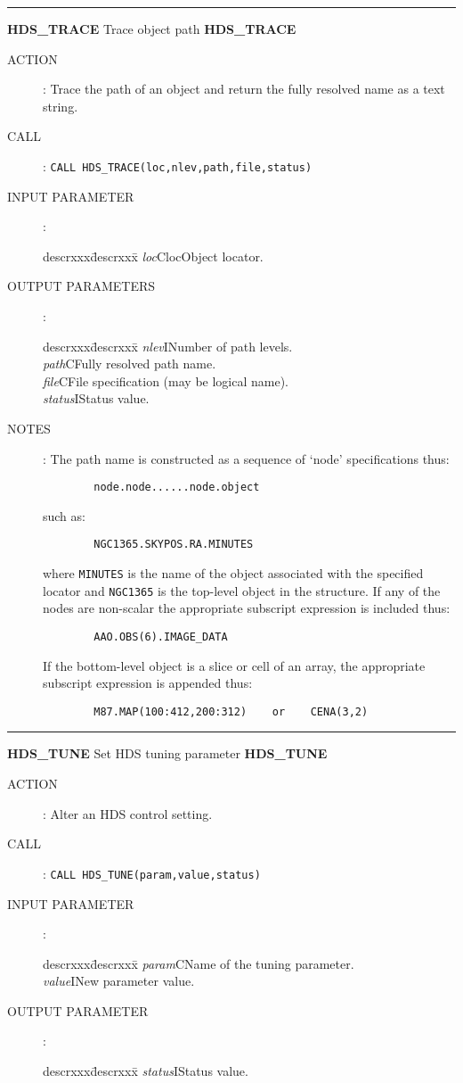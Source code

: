 \goodbreak
\rule{\textwidth}{0.3mm}
{\Large {\bf HDS\_TRACE} \hfill Trace object path \hfill {\bf HDS\_TRACE}}
\begin{description}
\item [ACTION]:
Trace the path of an object and return the fully resolved name as a text
string.
\item [CALL]:
{\tt CALL HDS\_TRACE(loc,nlev,path,file,status)}
\item [INPUT PARAMETER]:
\begin{tabbing}
descrxxx\=descrxxx\=\kill
{\em loc}\>Cloc\>Object locator.
\end{tabbing}
\item [OUTPUT PARAMETERS]:
\begin{tabbing}
descrxxx\=descrxxx\=\kill
{\em nlev}\>I\>Number of path levels.\\
{\em path}\>C\>Fully resolved path name.\\
{\em file}\>C\>File specification (may be logical name).\\
{\em status}\>I\>Status value.
\end{tabbing}
\item [NOTES]:
The path name is constructed as a sequence of `node' specifications thus:
\begin{verbatim}
        node.node......node.object
\end{verbatim}
such as:
\begin{verbatim}
        NGC1365.SKYPOS.RA.MINUTES
\end{verbatim}
where {\tt MINUTES} is the name of the object associated with the specified locator
and {\tt NGC1365} is the top-level object in the structure.
If any of the nodes are non-scalar the appropriate subscript expression is
included thus:
\begin{verbatim}
        AAO.OBS(6).IMAGE_DATA
\end{verbatim}
If the bottom-level object is a slice or cell of an array, the appropriate
subscript expression is appended thus:
\begin{verbatim}
        M87.MAP(100:412,200:312)    or    CENA(3,2)
\end{verbatim}
\end{description}
\goodbreak
\rule{\textwidth}{0.3mm}
{\Large {\bf HDS\_TUNE} \hfill Set HDS tuning parameter \hfill {\bf HDS\_TUNE}}
\begin{description}
\item [ACTION]:
Alter an HDS control setting.
\item [CALL]:
{\tt CALL HDS\_TUNE(param,value,status)}
\item [INPUT PARAMETER]:
\begin{tabbing}
descrxxx\=descrxxx\=\kill
{\em param}\>C\>Name of the tuning parameter.\\
{\em value}\>I\>New parameter value.
\end{tabbing}
\item [OUTPUT PARAMETER]:
\begin{tabbing}
descrxxx\=descrxxx\=\kill
{\em status}\>I\>Status value.
\end{tabbing}
\end{description}
\goodbreak

